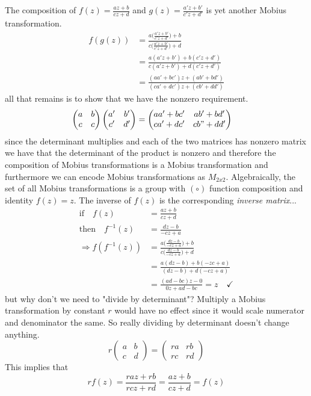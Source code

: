 \documentclass[a4paper, 11pt]{article}
\begin{document}
	\noindent The composition of $f(z) = \frac{az+b}{cz+d}$ and $g(z) = \frac{a'z+b'}{c'z+d'}$ is yet another Mobius transformation. 
		\begin{align*}
			f(g(z)) &=  \frac{a\Big(\frac{a'z+b'}{c'z+d'}\Big)+b}{c\Big(\frac{a'z+b'}{c'z+d'}\Big)+d}\\
				&= \frac{a(a'z+b')+b(c'z+d')}{c(a'z+b')+d(c'z+d')} \\ 
				&= \frac{(aa'+bc')z+(ab'+bd')}{(ca'+dc')z+(cb'+dd')}
		\end{align*}
	\noindent all that remains is to show that we have the nonzero requirement. 
		\begin{align*}
			\begin{pmatrix}
				a & b \\ 
				c & c \\ 
			\end{pmatrix}\begin{pmatrix}
				a' & b' \\ 
				c' & d' \\ 
			\end{pmatrix} &= \begin{pmatrix}
				aa' + bc' & ab' + bd' \\ 
				ca' + dc' & cb" + dd'
			\end{pmatrix}
		\end{align*}
	\noindent since the determinant multiplies and each of the two matrices has nonzero matrix we have that the determinant of the product is nonzero and therefore the composition of Mobius transformations is a Mobius transformation and furthermore we can encode Mobius transformations as $M_{2x2}$. Algebraically, the set of all Mobius transformations is a group with $(\circ)$ function composition and identity $f(z) =z$. The inverse of $f(z)$ is the corresponding \textit{inverse matrix}... 
		\begin{align*}
			\text{if}\quad f(z) &= \frac{az+b}{cz+d} \\ 
			\text{then} \quad f^{-1}(z) &= \frac{dz-b}{-cz+a}\\
			\Rightarrow f(f^{-1}(z)) &= \frac{a\Big(\frac{dz-b}{-cz+a}\Big)+b}{c\Big(\frac{dz-b}{-cz+a}\Big)+d} \\ 
				&=\frac{a(dz-b)+b(-zc+a)}{(dz-b)+d(-cz+a)} \\ 
				&= \frac{(ad-bc)z-0}{0z+ad-bc} = z \quad \checkmark
		\end{align*}
	\noindent but why don't we need to "divide by determinant"? Multiply a Mobius transformation by constant $r$ would have no effect since it would scale numerator and denominator the same. So really dividing by determinant doesn't change anything. 
		$$r\begin{pmatrix}
			a & b \\ 
			c & d
		\end{pmatrix} = \begin{pmatrix}
			ra & rb \\ 
			rc & rd
		\end{pmatrix} $$ 
	This implies that 
		$$rf(z) = \frac{raz+rb}{rcz+rd}= \frac{az+b}{cz+d} = f(z) $$
\end{document}
